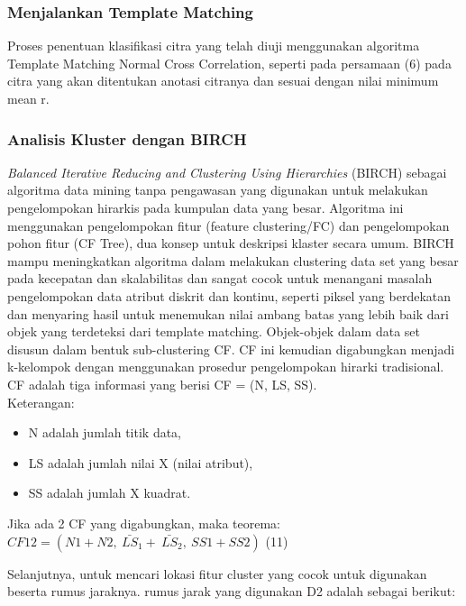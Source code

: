 \subsubsection{Menjalankan Template Matching}
\hspace{1,2cm}	Proses penentuan klasifikasi citra yang telah diuji menggunakan algoritma Template Matching Normal Cross Correlation, seperti pada persamaan (6) pada citra yang akan ditentukan anotasi citranya dan sesuai dengan nilai minimum mean r.

\subsubsection{Analisis Kluster dengan BIRCH}
\hspace{1,2cm}\textit{Balanced Iterative Reducing and Clustering Using Hierarchies} (BIRCH) sebagai algoritma data mining tanpa pengawasan yang digunakan untuk melakukan pengelompokan hirarkis pada kumpulan data yang besar. Algoritma ini menggunakan pengelompokan fitur (feature clustering/FC) dan pengelompokan pohon fitur (CF Tree), dua konsep untuk deskripsi klaster secara umum. BIRCH mampu meningkatkan algoritma dalam melakukan clustering data set yang besar pada kecepatan dan skalabilitas dan sangat cocok untuk menangani masalah pengelompokan data atribut diskrit dan kontinu, seperti piksel yang berdekatan dan menyaring hasil untuk menemukan nilai ambang batas yang lebih baik dari objek yang terdeteksi dari template matching. Objek-objek dalam data set disusun dalam bentuk sub-clustering CF. CF ini kemudian digabungkan menjadi k-kelompok dengan menggunakan prosedur pengelompokan hirarki tradisional. CF adalah tiga informasi yang berisi CF = (N, LS, SS).\\
Keterangan:
\begin{itemize}
	\item N adalah jumlah titik data,
	
	\item LS adalah jumlah nilai X (nilai atribut), 
	
	\item SS adalah jumlah X kuadrat.
	
\end{itemize}

Jika ada 2 CF yang digabungkan, maka teorema:\\
$CF12=(N1+N2,\ {\bar{LS}}_1+\ {\bar{LS}}_2,\ SS1+SS2)$ \hfill (11)

Selanjutnya, untuk mencari lokasi fitur cluster yang cocok untuk digunakan beserta rumus jaraknya. rumus jarak yang digunakan D2 adalah sebagai berikut:

